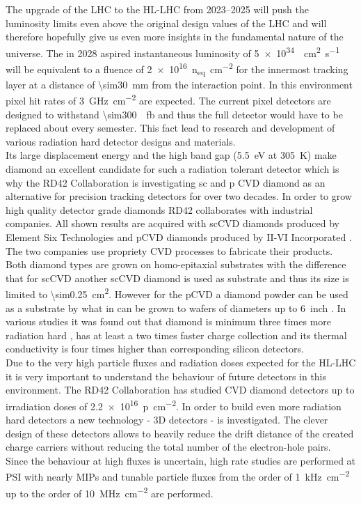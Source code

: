 The upgrade of the \ac{LHC} to the \ac{HL-LHC} from \SIrange{2023}{2025}{} \cite{hllhc} will push the luminosity limits even above the original design values of the \ac{LHC} and will therefore hopefully give us even more insights in the fundamental nature of the universe. The in 2028 aspired instantaneous luminosity of \SI{5e34}{\per\centi\meter\squared\per\second} will be equivalent to a fluence of \SI{2e16}{n_{eq}\per \centi\meter^2} \cite{auzinger} for the innermost tracking layer at a distance of \SI{\sim30}{\milli\meter} from the interaction point. In this environment pixel hit rates of \SI{3}{\giga\hertz\per\centi\meter^2} are expected. The current pixel detectors are designed to withstand \SI{\sim300}{\per\femto\barn} and thus the full detector would have to be replaced about every semester. This fact lead to research and development of various radiation hard detector designs and materials.\\
Its large displacement energy and the high band gap (\SI{5.5}{\electronvolt} at \SI{305}{\kelvin}) make diamond an excellent candidate for such a radiation tolerant detector which is why the RD42 Collaboration is investigating \ac{sc} and \ac{p} \ac{CVD} diamond as an alternative for precision tracking detectors for over two decades. In order to grow high quality detector grade diamonds RD42 collaborates with industrial companies. All shown results are acquired with \ac{sc}\ac{CVD} diamonds produced by Element Six Technologies \cite{e6} and \ac{p}\ac{CVD} diamonds produced by II-VI Incorporated \cite{II6}. The two companies use propriety \ac{CVD} processes to fabricate their products. Both diamond types are grown on homo-epitaxial substrates with the difference that for \ac{sc}\ac{CVD} another \ac{sc}\ac{CVD} diamond is used as substrate and thus its size is limited to \SI{\sim0.25}{\centi\meter\squared}. However for the \ac{p}\ac{CVD} a diamond powder can be used as a substrate by what in can be grown to wafers of diameters up to \SI{6}{inch} \cite{felix}. In various studies it was found out that diamond is minimum three times more radiation hard \cite{deboer}, has at least a two times faster charge collection \cite{pernegger} and its thermal conductivity is four times higher \cite{zhao} than corresponding silicon detectors.\\
Due to the very high particle fluxes and radiation doses expected for the \ac{HL-LHC} it is very important to understand the behaviour of future detectors in this environment. The RD42 Collaboration has studied \ac{CVD} diamond detectors up to irradiation doses of \SI{2.2e16}{p\per\centi\meter^2}. In order to build even more radiation hard detectors a new technology - 3D detectors \cite{3D} - is investigated. The clever design of these detectors allows to heavily reduce the drift distance of the created charge carriers without reducing the total number of the electron-hole pairs. Since the behaviour at high fluxes is uncertain, high rate studies are performed at \ac{PSI} with nearly \acp{MIP} and tunable particle fluxes from the order of \SI{1}{\kilo\hertz\per cm^2} up to the order of \SI{10}{\mega\hertz\per cm^2} are performed.